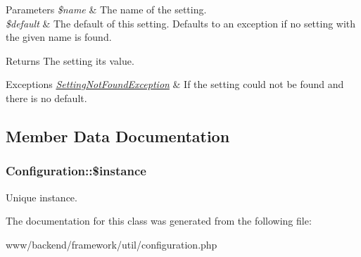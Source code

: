 \begin{DoxyParams}{Parameters}
{\em \$name} & The name of the setting. \\
\hline
{\em \$default} & The default of this setting. Defaults to an exception if no setting with the given name is found.\\
\hline
\end{DoxyParams}
\begin{DoxyReturn}{Returns}
The setting its value.
\end{DoxyReturn}

\begin{DoxyExceptions}{Exceptions}
{\em \hyperlink{classSettingNotFoundException}{SettingNotFoundException}} & If the setting could not be found and there is no default. \\
\hline
\end{DoxyExceptions}


\subsection{Member Data Documentation}
\hypertarget{classConfiguration_a1f4b6d097ad7230a63eba874ddbc7bef}{
\subsubsection[{\$instance}]{\setlength{\rightskip}{0pt plus 5cm}Configuration::\$instance}}
\label{classConfiguration_a1f4b6d097ad7230a63eba874ddbc7bef}
Unique instance. 

The documentation for this class was generated from the following file:\begin{DoxyCompactItemize}
\item 
www/backend/framework/util/configuration.php\end{DoxyCompactItemize}
